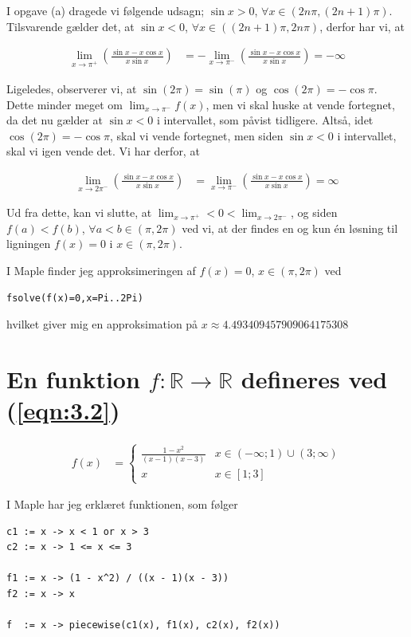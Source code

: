 \documentclass[11pt,a4paper]{article}
\newcommand{\limit}[2]{\lim_{#1 \rightarrow #2}}
\newcommand{\eqnref}[1]{(\ref{eqn:#1})}
\begin{document}
I opgave (a) dragede vi følgende udsagn; $\sin x > 0$, $\forall x \in (2n\pi,
(2n+1)\pi)$. Tilsvarende gælder det, at $\sin x < 0$, $\forall x \in ((2n+1)\pi,
2n\pi)$, derfor har vi, at

\begin{align}
    \limit{x}{\pi^+} \left( \frac{\sin x - x \cos x}{x \sin x} \right)
    &= -\limit{x}{\pi^-} \left( \frac{\sin x - x \cos x}{x \sin x} \right)
     = -\infty
\end{align}

Ligeledes, observerer vi, at $\sin(2\pi) = \sin(\pi)$ og $\cos(2\pi) = -\cos
\pi$. Dette minder meget om $\limit{x}{\pi^-} f(x)$, men vi skal huske at
vende fortegnet, da det nu gælder at $\sin x < 0$ i intervallet, som påvist
tidligere. Altså, idet $\cos(2\pi) = -\cos \pi$, skal vi vende fortegnet, men
siden $\sin x < 0$ i intervallet, skal vi igen vende det. Vi har derfor, at

\begin{align}
    \limit{x}{2 \pi^-} \left( \frac{\sin x - x \cos x}{x \sin x} \right)
    &= \limit{x}{\pi^-} \left( \frac{\sin x - x \cos x}{x \sin x} \right)
     = \infty
\end{align}

Ud fra dette, kan vi slutte, at $\limit{x}{\pi^+} < 0 < \limit{x}{2\pi^-}$,
og siden $f(a) < f(b)$, $\forall a < b \in (\pi, 2\pi)$ ved vi, at der
findes en og kun én løsning til ligningen $f(x) = 0$ i $x \in (\pi, 2\pi)$.

I Maple finder jeg approksimeringen af $f(x) = 0$, $x \in (\pi,2\pi)$ ved
\begin{lstlisting}
fsolve(f(x)=0,x=Pi..2Pi)
\end{lstlisting}
hvilket giver mig en approksimation på $x \approx 4.493409457909064175308$

\section
{
    \mdseries
    En funktion $f : \mathbb{R} \rightarrow \mathbb{R}$ defineres ved
    \eqnref{3.2}
}
\begin{align}
    f(x) &=
    \begin{cases}
        \frac{1 - x^2}{(x -1)(x - 3)} &x \in (-\infty;1) \cup (3;\infty) \\
        x &x \in [1;3]
    \end{cases}
    \label{eqn:3.2}
\end{align}

I Maple har jeg erklæret funktionen, som følger
\begin{lstlisting}
c1 := x -> x < 1 or x > 3
c2 := x -> 1 <= x <= 3

f1 := x -> (1 - x^2) / ((x - 1)(x - 3))
f2 := x -> x

f  := x -> piecewise(c1(x), f1(x), c2(x), f2(x))
\end{lstlisting}
\end{document}

